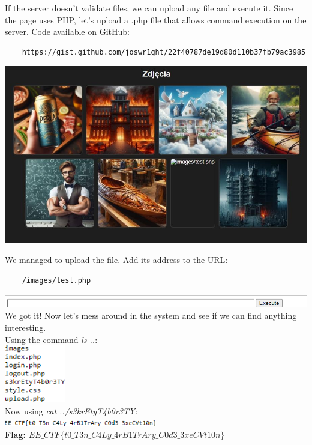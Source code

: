 \documentclass{article}
\begin{document}
If the server doesn’t validate files, we can upload any file and execute it. Since the page uses PHP, let’s upload a .php file that allows command execution on the server. Code available on GitHub:
\begin{verbatim}
    https://gist.github.com/joswr1ght/22f40787de19d80d110b37fb79ac3985
\end{verbatim}
\includegraphics[width=\textwidth]{"image44.jpeg"}

\newpage
We managed to upload the file. Add its address to the URL:
\begin{verbatim}
    /images/test.php
\end{verbatim}
\includegraphics[width=\textwidth]{"image45.png"} \\
We got it! Now let's mess around in the system and see if we can find anything interesting.
\vspace{3mm} \\
Using the command \textit{ls ..}:
\vspace{3mm} \\
\includegraphics[width=0.2\textwidth]{"image46.png"} \\
Now using \textit{cat ../s3krEtyT4b0r3TY}:
\vspace{3mm} \\
\includegraphics[width=0.5\textwidth]{"image47.png"}
\vspace{3mm} \\
\textbf{Flag:} $ EE\_CTF\{t0\_T3n\_C4Ly\_4rB1TrAry\_C0d3\_3xeCVt10n\} $
\end{document}
